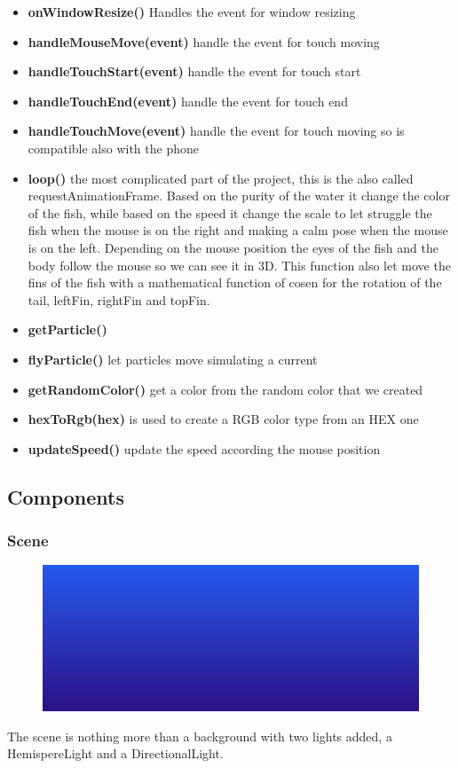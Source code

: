 \documentclass[a4paper,10pt]{article}
\begin{document}
\begin{itemize}
 \item {\bf  onWindowResize()} Handles the event for window resizing
 \item {\bf handleMouseMove(event)} handle the event for touch moving
 \item {\bf handleTouchStart(event)} handle the event for touch start
 \item {\bf handleTouchEnd(event)} handle the event for touch end
 \item {\bf handleTouchMove(event)} handle the event for touch moving so is compatible also with the phone
 \item {\bf loop()} the most complicated part of the project, this is the also called requestAnimationFrame.
 Based on the purity of the water it change the color of the fish, while based on the speed it change the scale to let struggle the fish when the mouse is on the right and making a calm pose when the mouse is on the left.
 Depending on the mouse position the eyes of the fish and the body follow the mouse so we can see it in 3D.
 This function also let move the fins of the fish with a mathematical function of cosen for the rotation of the tail, leftFin, rightFin and topFin.
 \item {\bf getParticle()}
 \item {\bf flyParticle()} let particles move simulating a current
 \item {\bf getRandomColor()} get a color from the random color that we created
 \item {\bf hexToRgb(hex)} is used to create a RGB color type from an HEX one
 \item {\bf updateSpeed()} update the speed according the mouse position
 
 
 
 
 
 
\end{itemize}



\subsection{Components}


\subsubsection{Scene}
\begin{figure}[H]
  \includegraphics[width=\linewidth]{Screenshot_20190226_195128.png}
\end{figure}
The scene is nothing more than a background with two lights added, a HemispereLight and a DirectionalLight.
\end{document}
